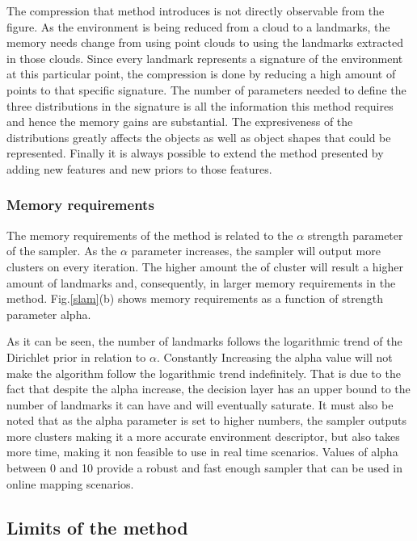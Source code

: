 \documentclass[]{article}
\begin{document}
The compression that method introduces is not directly observable from the figure. As the environment is being reduced from a cloud to a landmarks, the memory needs change from using point clouds to using the landmarks extracted in those clouds. Since every landmark represents a signature of the environment at this particular point, the compression is done by reducing a high amount of points to that specific signature. The number of parameters needed to define the three distributions in the signature is all the information this method requires and hence the memory gains are substantial. The expresiveness of the distributions greatly affects the objects as well as object shapes that could be represented. Finally it is always possible to extend the method presented by adding new features and new priors to those features.


\subsubsection{Memory requirements}

The memory requirements of the method is related to the $\alpha$ strength parameter of the sampler. As the $\alpha$ parameter increases, the sampler will output more clusters on every iteration. The higher amount the of cluster will result a higher amount of landmarks and, consequently, in larger memory requirements in the method. Fig.\ref{slam}(b) shows memory requirements as a function of strength parameter alpha.

    As it can be seen, the number of landmarks follows the logarithmic trend of the Dirichlet prior in relation to $\alpha$. Constantly Increasing the alpha value will not make the algorithm follow the logarithmic trend indefinitely. That is due to the fact that despite the alpha increase, the decision layer has an upper bound to the number of landmarks it can have and will eventually saturate. It must also be noted that as the alpha parameter is set to higher numbers, the sampler outputs more clusters making it a more accurate environment descriptor, but also takes more time, making it non feasible to use in real time scenarios. Values of alpha between 0 and 10 provide a robust and fast enough sampler that can be used in online mapping scenarios.

    \subsection{Limits of the method}
\end{document}
